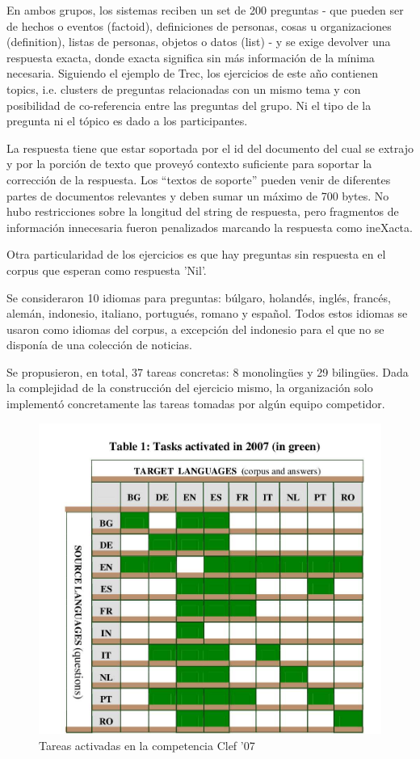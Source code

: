 En ambos grupos, los sistemas reciben un set de 200 preguntas - que pueden ser de hechos o eventos (factoid), definiciones de personas, cosas u organizaciones (definition), listas de personas, objetos o datos (list) - y se exige devolver una respuesta exacta, donde exacta significa sin más información de la mínima necesaria. Siguiendo el ejemplo de Trec, los ejercicios de este año contienen topics, i.e. clusters de preguntas relacionadas con un mismo tema y con posibilidad de co-referencia entre las preguntas del grupo. Ni el tipo de la pregunta ni el tópico es dado a los participantes.

La respuesta tiene que estar soportada por el id del documento del cual se extrajo y por la porción de texto que proveyó contexto suficiente para soportar la corrección de la respuesta. Los “textos de soporte” pueden venir de diferentes partes de documentos relevantes y deben sumar un máximo de 700 bytes. No hubo restricciones sobre la longitud del string de respuesta, pero fragmentos de información innecesaria fueron penalizados marcando la respuesta como ineXacta.

Otra particularidad de los ejercicios es que hay preguntas sin respuesta en el corpus que esperan como respuesta 'Nil'.


Se consideraron 10 idiomas para preguntas: búlgaro, holandés, inglés, francés, alemán, indonesio, italiano, portugués, romano y español. Todos estos idiomas se usaron como idiomas del corpus, a excepción del indonesio para el que no se disponía de una colección de noticias.

Se propusieron, en total, 37 tareas concretas: 8 monolingües y 29 bilingües. Dada la complejidad de la construcción del ejercicio mismo, la organización solo implementó concretamente las tareas tomadas por algún equipo competidor.


\begin{figure}
  \centering
    \includegraphics[scale=0.5]{graficos/clef07}
  \caption{Tareas activadas en la competencia Clef '07}
  \label{fig:tareas}
\end{figure}

